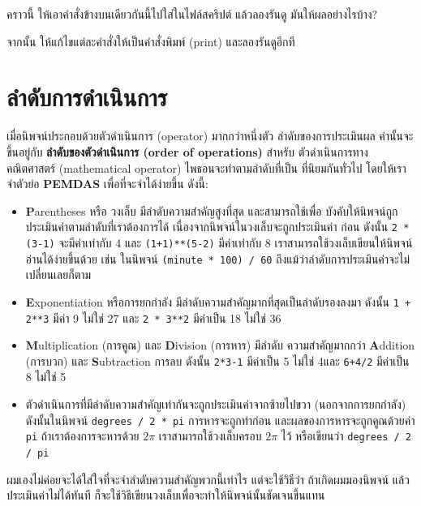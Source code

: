 คราวนี้ ให้เอาคำสั่งข้างบนเดียวกันนี้ไปใส่ในไฟล์สคริปต์ แล้วลองรันดู
มันให้ผลอย่างไรบ้าง?

จากนั้น ให้แก้ไขแต่ละคำสั่งให้เป็นคำสั่งพิมพ์ (print) และลองรันดูอีกที



\section{ลำดับการดำเนินการ } %

เมื่อนิพจน์ประกอบด้วยตัวดำเนินการ (operator) มากกว่าหนึ่งตัว ลำดับของการประเมินผล
ค่านั้นจะขึ้นอยู่กับ {\bf ลำดับของตัวดำเนินการ (order of operations)} สำหรับ
ตัวดำเนินการทางคณิตศาสตร์ (mathematical operator) ไพธอนจะทำตามลำดับที่เป็น
ที่นิยมกันทั่วไป โดยให้เราจำตัวย่อ {\bf PEMDAS} เพื่อที่จะจำได้ง่ายขึ้น ดังนี้:

\begin{itemize}

\item {\bf P}arentheses หรือ วงเล็บ มีลำดับความสำคัญสูงที่สุด และสามารถใช้เพื่อ
บังคับให้นิพจน์ถูกประเมินค่าตามลำดับที่เราต้องการได้  เนื่องจากนิพจน์ในวงเล็บจะถูกประเมินค่า
ก่อน ดังนั้น {\tt 2 * (3-1)} จะมีค่าเท่ากับ 4 และ {\tt (1+1)**(5-2)} มีค่าเท่ากับ 8 
 เราสามารถใช้วงเล็บเขียนให้นิพจน์อ่านได้ง่ายขึ้นด้วย เช่น ในนิพจน์  {\tt (minute * 100) / 60} 
 ถึงแม้ว่าลำดับการประเมินค่าจะไม่เปลี่ยนเลยก็ตาม

\item {\bf E}xponentiation หรือการยกกำลัง มีลำดับความสำคัญมากที่สุดเป็นลำดับรองลงมา 
ดังนั้น {\tt 1 + 2**3} มีค่า 9 ไม่ใช่ 27 และ {\tt 2 * 3**2} มีค่าเป็น 18 ไม่ใช่ 36

\item {\bf M}ultiplication (การคูณ) และ {\bf D}ivision (การหาร) มีลำดับ
ความสำคัญมากกว่า {\bf A}ddition (การบวก) และ {\bf S}ubtraction การลบ ดังนั้น 
{\tt 2*3-1} มีค่าเป็น 5 ไม่ใช่ 4และ {\tt 6+4/2} มีค่าเป็น 8 ไม่ใช่ 5

\item ตัวดำเนินการที่มีลำดับความสำคัญเท่ากันจะถูกประเมินค่าจากซ้ายไปขวา (นอกจากการยกกำลัง)
 ดังนั้นในนิพจน์ {\tt degrees / 2 * pi} การหารจะถูกทำก่อน และผลของการหารจะถูกคูณด้วยค่า 
 {\tt pi} ถ้าเราต้องการจะหารด้วย {\scriptsize$2 \pi$} เราสามารถใช้วงเล็บครอบ {\scriptsize$2 \pi$} ไว้ หรือเขียนว่า 
 {\tt degrees / 2 / pi}

\end{itemize}

ผมเองไม่ค่อยจะได้ใส่ใจที่จะจำลำดับความสำคัญพวกนี้เท่าไร แต่จะใช้วิธีว่า ถ้าเกิดผมมองนิพจน์ แล้ว
ประเมินค่าไม่ได้ทันที ก็จะใช้วิธีเขียนวงเล็บเพื่อจะทำให้นิพจน์นั้นชัดเจนขึ้นแทน


